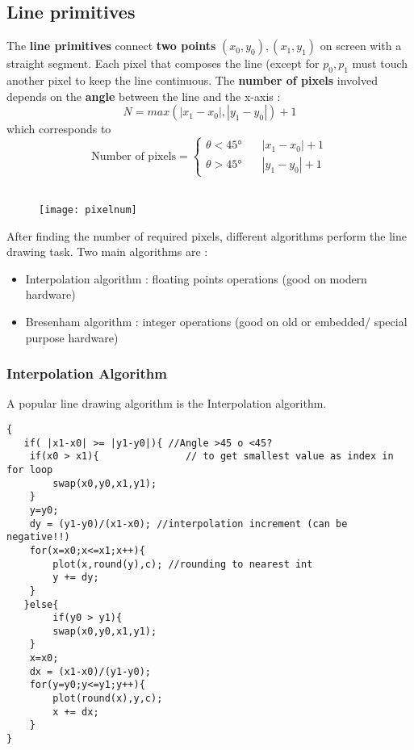 \subsection{Line primitives}
The \textbf{line primitives} connect \textbf{two points} $(x_0,y_0) , (x_1,y_1) $ on screen with a straight segment. Each pixel that composes the line (except for $ p_0 , p_1 $ must touch another pixel to keep the line continuous. The \textbf{number of pixels} involved depends on the \textbf{angle} between the line and the x-axis : 
$$ N = max(|x_1-x_0|,|y_1-y_0|)+1 $$ which corresponds to 
\[ \text{Number of pixels} =
\begin{cases}
	\theta < 45° & \quad |x_1-x_0|+1 \\
	\theta > 45° & \quad |y_1-y_0|+1 
\end{cases}
\]\\
\begin{figure}[H]
 \centering
  \texttt{[image: pixelnum]}
\end{figure}
After finding the number of required pixels, different algorithms perform the line drawing task. Two main algorithms are :
\begin{itemize}
\item Interpolation algorithm : floating points operations (good on modern hardware)
\item Bresenham algorithm : integer operations (good on old or embedded/ special purpose hardware)
\end{itemize}
\newpage
\subsubsection{Interpolation Algorithm}
A popular line drawing algorithm is the Interpolation algorithm.

\begin{lstlisting}
{
   if( |x1-x0| >= |y1-y0|){ //Angle >45 o <45?
   	if(x0 > x1){			   // to get smallest value as index in for loop
   		swap(x0,y0,x1,y1); 
   	}
   	y=y0;
   	dy = (y1-y0)/(x1-x0); //interpolation increment (can be negative!!)
   	for(x=x0;x<=x1;x++){
   		plot(x,round(y),c); //rounding to nearest int
   		y += dy;
   	}
   }else{
   	  	if(y0 > y1){
   		swap(x0,y0,x1,y1);
   	}
   	x=x0;
   	dx = (x1-x0)/(y1-y0);
   	for(y=y0;y<=y1;y++){
   		plot(round(x),y,c);
   		x += dx;
   	}
}
\end{lstlisting}
\newpage
